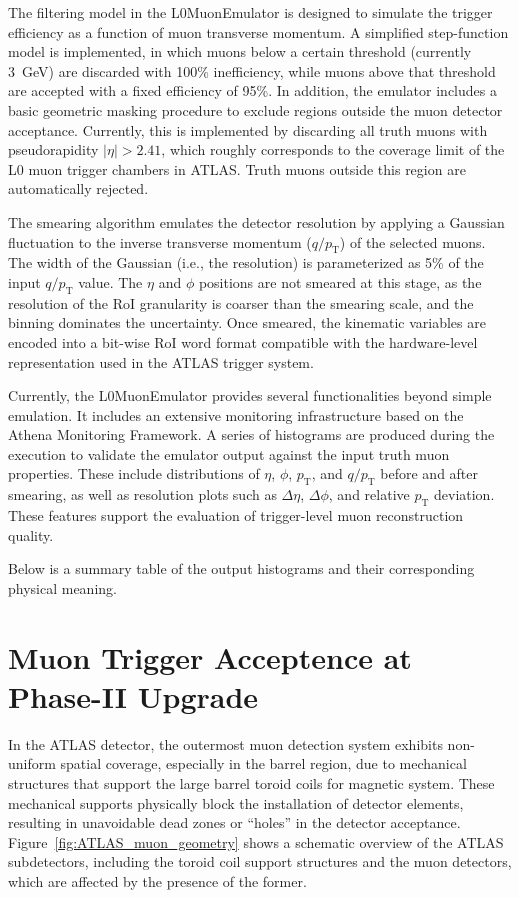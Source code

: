 The filtering model in the L0MuonEmulator is designed to simulate the trigger efficiency as a function of muon transverse momentum. A simplified step-function model is implemented, in which muons below a certain threshold (currently 3~GeV) are discarded with 100\% inefficiency, while muons above that threshold are accepted with a fixed efficiency of 95\%. In addition, the emulator includes a basic geometric masking procedure to exclude regions outside the muon detector acceptance. Currently, this is implemented by discarding all truth muons with pseudorapidity $|\eta| > 2.41$, which roughly corresponds to the coverage limit of the L0 muon trigger chambers in ATLAS. Truth muons outside this region are automatically rejected.

The smearing algorithm emulates the detector resolution by applying a Gaussian fluctuation to the inverse transverse momentum ($q/p_\mathrm{T}$) of the selected muons. The width of the Gaussian (i.e., the resolution) is parameterized as 5\% of the input $q/p_\mathrm{T}$ value. The $\eta$ and $\phi$ positions are not smeared at this stage, as the resolution of the RoI granularity is coarser than the smearing scale, and the binning dominates the uncertainty. Once smeared, the kinematic variables are encoded into a bit-wise RoI word format compatible with the hardware-level representation used in the ATLAS trigger system.

Currently, the L0MuonEmulator provides several functionalities beyond simple emulation. It includes an extensive monitoring infrastructure based on the Athena Monitoring Framework. A series of histograms are produced during the execution to validate the emulator output against the input truth muon properties. These include distributions of $\eta$, $\phi$, $p_\mathrm{T}$, and $q/p_\mathrm{T}$ before and after smearing, as well as resolution plots such as $\Delta\eta$, $\Delta\phi$, and relative $p_\mathrm{T}$ deviation. These features support the evaluation of trigger-level muon reconstruction quality.

Below is a summary table of the output histograms and their corresponding physical meaning.


\section{Muon Trigger Acceptence at Phase-II Upgrade} \label{subsec:MuonTriggerAcceptance}
In the ATLAS detector, the outermost muon detection system exhibits non-uniform spatial coverage, especially in the barrel region, due to mechanical structures that support the large barrel toroid coils for magnetic system. These mechanical supports physically block the installation of detector elements, resulting in unavoidable dead zones or ``holes'' in the detector acceptance. Figure~\ref{fig:ATLAS_muon_geometry} shows a schematic overview of the ATLAS subdetectors, including the toroid coil support structures and the muon detectors, which are affected by the presence of the former.

